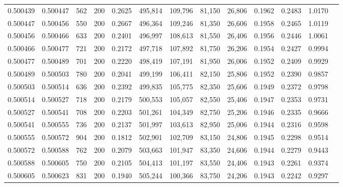 \begin{tabular}{rrrrrrrrrrrrr}
0.500439 & 0.500447 &   562 & 200 &                                     0.2625 & 495,814 & 109,796 &  81,150 &  26,806 & 0.1962 & 0.2483 & 1.0170 \\
0.500447 & 0.500456 &   550 & 200 &                                     0.2667 & 496,364 & 109,246 &  81,350 &  26,606 & 0.1958 & 0.2465 & 1.0119 \\
0.500456 & 0.500466 &   633 & 200 &                                     0.2401 & 496,997 & 108,613 &  81,550 &  26,406 & 0.1956 & 0.2446 & 1.0061 \\
0.500466 & 0.500477 &   721 & 200 &                                     0.2172 & 497,718 & 107,892 &  81,750 &  26,206 & 0.1954 & 0.2427 & 0.9994 \\
0.500477 & 0.500489 &   701 & 200 &                                     0.2220 & 498,419 & 107,191 &  81,950 &  26,006 & 0.1952 & 0.2409 & 0.9929 \\
0.500489 & 0.500503 &   780 & 200 &                                     0.2041 & 499,199 & 106,411 &  82,150 &  25,806 & 0.1952 & 0.2390 & 0.9857 \\
0.500503 & 0.500514 &   636 & 200 &                                     0.2392 & 499,835 & 105,775 &  82,350 &  25,606 & 0.1949 & 0.2372 & 0.9798 \\
0.500514 & 0.500527 &   718 & 200 &                                     0.2179 & 500,553 & 105,057 &  82,550 &  25,406 & 0.1947 & 0.2353 & 0.9731 \\
0.500527 & 0.500541 &   708 & 200 &                                     0.2203 & 501,261 & 104,349 &  82,750 &  25,206 & 0.1946 & 0.2335 & 0.9666 \\
0.500541 & 0.500555 &   736 & 200 &                                     0.2137 & 501,997 & 103,613 &  82,950 &  25,006 & 0.1944 & 0.2316 & 0.9598 \\
0.500555 & 0.500572 &   904 & 200 &                                     0.1812 & 502,901 & 102,709 &  83,150 &  24,806 & 0.1945 & 0.2298 & 0.9514 \\
0.500572 & 0.500588 &   762 & 200 &                                     0.2079 & 503,663 & 101,947 &  83,350 &  24,606 & 0.1944 & 0.2279 & 0.9443 \\
0.500588 & 0.500605 &   750 & 200 &                                     0.2105 & 504,413 & 101,197 &  83,550 &  24,406 & 0.1943 & 0.2261 & 0.9374 \\
0.500605 & 0.500623 &   831 & 200 &                                     0.1940 & 505,244 & 100,366 &  83,750 &  24,206 & 0.1943 & 0.2242 & 0.9297 \\

\end{tabular}
